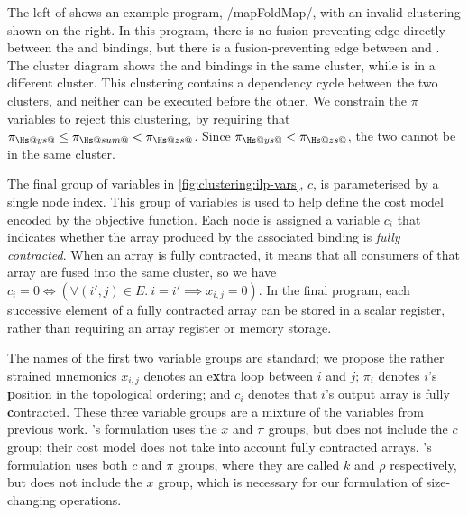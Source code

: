 The left of  shows an example program, \Hs/mapFoldMap/, with an invalid clustering shown on the right.
In this program, there is no fusion-preventing edge directly between the \Hs@ys@ and \Hs@zs@ bindings, but there is a fusion-preventing edge between \Hs@sum@ and \Hs@zs@.
The cluster diagram shows the \Hs@ys@ and \Hs@zs@ bindings in the same cluster, while \Hs@sum@ is in a different cluster.
This clustering contains a dependency cycle between the two clusters, and neither can be executed before the other.
We constrain the $\pi$ variables to reject this clustering, by requiring that $\pi_{\Hs@ys@} \le \pi_{\Hs@sum@} < \pi_{\Hs@zs@}$.
Since $\pi_{\Hs@ys@} < \pi_{\Hs@zs@}$, the two cannot be in the same cluster.


The final group of variables in \cref{fig:clustering:ilp-vars}, $c$, is parameterised by a single node index.
This group of variables is used to help define the cost model encoded by the objective function.
Each node is assigned a variable $c_i$ that indicates whether the array produced by the associated binding is \emph{fully contracted}.
When an array is fully contracted, it means that all consumers of that array are fused into the same cluster, so we have $c_i = 0 \iff (\forall (i',j) \in E.\ i = i' \implies x_{i,j} = 0)$.
In the final program, each successive element of a fully contracted array can be stored in a scalar register, rather than requiring an array register or memory storage. 

The names of the first two variable groups are standard; we propose the rather strained mnemonics $x_{i,j}$ denotes an e{\bf x}tra loop between $i$ and $j$; $\pi_i$ denotes $i$'s {\bf p}osition in the topological ordering; and $c_i$ denotes that $i$'s output array is fully {\bf c}ontracted.
These three variable groups are a mixture of the variables from previous work.
\citet{megiddo1998optimal}'s formulation uses the $x$ and $\pi$ groups, but does not include the $c$ group; their cost model does not take into account fully contracted arrays.
\citet{darte2002contraction}'s formulation uses both $c$ and $\pi$ groups, where they are called $k$ and $\rho$ respectively, but does not include the $x$ group, which is necessary for our formulation of size-changing operations.


